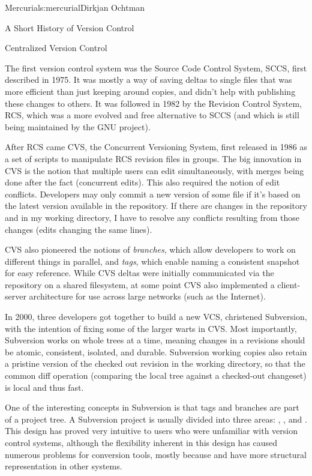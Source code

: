 \begin{aosachapter}{Mercurial}{s:mercurial}{Dirkjan Ochtman}
\begin{aosasect1}{ A Short History of Version Control}
\begin{aosasect2}{Centralized Version Control}

The first version control system was the Source Code Control System,
SCCS, first described in 1975. It was mostly a way of saving deltas to
single files that was more efficient than just keeping around copies,
and didn't help with publishing these changes to others. It was
followed in 1982 by the Revision Control System, RCS, which was a more
evolved and free alternative to SCCS (and which is still being
maintained by the GNU project).

After RCS came CVS, the Concurrent Versioning System, first released
in 1986 as a set of scripts to manipulate RCS revision files in
groups. The big innovation in CVS is the notion that multiple users can
edit simultaneously, with merges being done after the fact
(concurrent edits). This also required the notion of edit conflicts.
Developers may only commit a new version of some file if it's based
on the latest version available in the repository. If there are changes
in the repository and in my working directory, I have to resolve any
conflicts resulting from those changes (edits changing the same lines).

CVS also pioneered the notions of \emph{branches}, which allow
developers to work on different things in parallel, and \emph{tags},
which enable naming a consistent snapshot for easy reference. While
CVS deltas were initially communicated via the repository on a shared
filesystem, at some point CVS also implemented a client-server
architecture for use across large networks (such as the Internet).

In 2000, three developers got together to build a new VCS, christened
Subversion, with the intention of fixing some of the larger
warts in CVS\@. Most importantly, Subversion works on whole trees at a
time, meaning changes in a revisions should be atomic, consistent,
isolated, and durable. Subversion working copies also retain a
pristine version of the checked out revision in the working directory,
so that the common diff operation (comparing the local tree against
a checked-out changeset) is local and thus fast.

One of the interesting concepts in Subversion is that tags and
branches are part of a project tree. A Subversion project is usually
divided into three areas: , , and
. This design has proved very intuitive to users who were
unfamiliar with version control systems, although the flexibility
inherent in this design has caused
numerous problems for conversion tools, mostly because  and
 have more structural representation in other systems.


\end{aosasect2}
\end{aosasect1}
\end{aosachapter}
